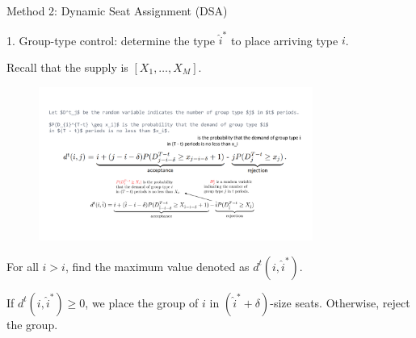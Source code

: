     \begin{frame}{Method 2: Dynamic Seat Assignment (DSA)}
      

      1. {\color{red} Group-type control}: determine the type $\hat{i}^{*}$ to place arriving type $i$. 
      
      \vspace{0.2cm}

      Recall that the supply is $[X_1, \ldots, X_M]$. 

      \vspace{-0.1cm}
  
      \begin{figure}[h]
        \centering
        \includegraphics[width = 0.8\textwidth]{./images/group_type.pdf}
      \end{figure}
  
      \vspace{-0.1cm}
  
      For all $\hat{i} > i$, find the maximum value denoted as $d^{t}(i, \hat{i}^{*})$.
      \vspace{0.1cm}

      If $d^{t}(i, \hat{i}^{*}) \geq 0$, we place the group of $i$ in $(\hat{i}^{*} + \delta)$-size seats. Otherwise, reject the group.
    \end{frame}

